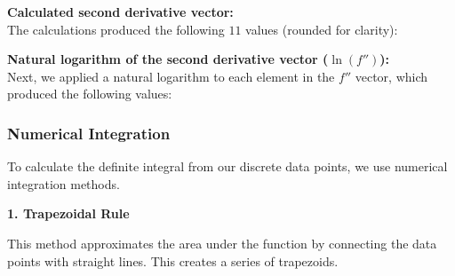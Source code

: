 \documentclass{article}
\begin{document}
\vspace{5pt}
\noindent \textbf{Calculated second derivative vector:} \\
The calculations produced the following $11$ values (rounded for clarity):

\begin{center}
\end{center}

\vspace{5pt}
\noindent \textbf{Natural logarithm of the second derivative vector ($\ln(f'')$):} \\
Next, we applied a natural logarithm to each element in the $f''$ vector, which produced the following values:

\begin{center}
\end{center}

\vspace{10pt}
\subsubsection{Numerical Integration}

To calculate the definite integral from our discrete data points, we use numerical integration methods. 

\vspace{5pt}
\noindent \textbf{1. Trapezoidal Rule} \cite[page 255]{Sauer2014}

This method approximates the area under the function by connecting the data points with straight lines. This creates a series of trapezoids.
\end{document}
